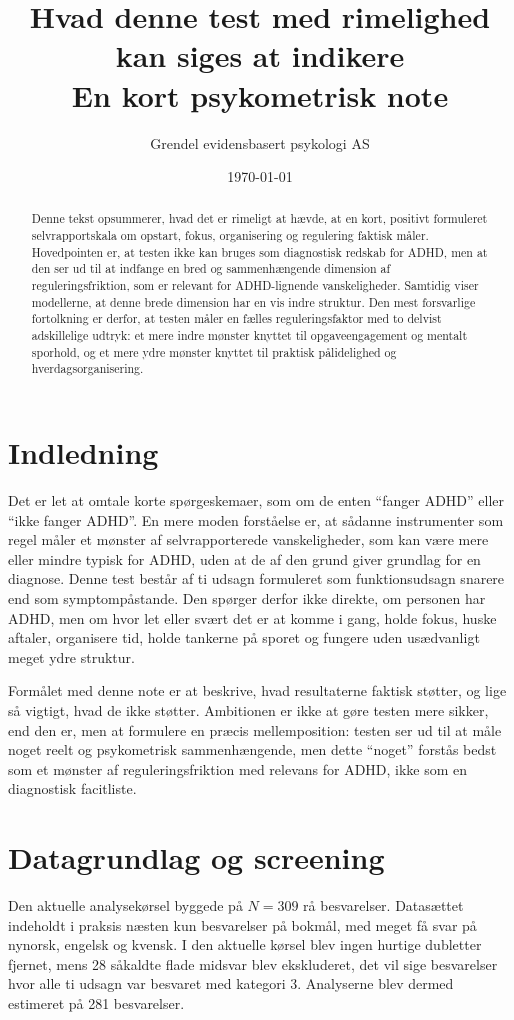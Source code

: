 \documentclass[11pt,a4paper]{article}
\title{Hvad denne test med rimelighed kan siges at indikere\\
\large En kort psykometrisk note}
\author{Grendel evidensbasert psykologi AS}
\date{\today}
\begin{document}
\maketitle

\begin{abstract}
Denne tekst opsummerer, hvad det er rimeligt at hævde, at en kort, positivt formuleret selvrapportskala om opstart, fokus, organisering og regulering faktisk måler. Hovedpointen er, at testen ikke kan bruges som diagnostisk redskab for ADHD, men at den ser ud til at indfange en bred og sammenhængende dimension af reguleringsfriktion, som er relevant for ADHD-lignende vanskeligheder. Samtidig viser modellerne, at denne brede dimension har en vis indre struktur. Den mest forsvarlige fortolkning er derfor, at testen måler en fælles reguleringsfaktor med to delvist adskillelige udtryk: et mere indre mønster knyttet til opgaveengagement og mentalt sporhold, og et mere ydre mønster knyttet til praktisk pålidelighed og hverdagsorganisering.
\end{abstract}

\section{Indledning}
Det er let at omtale korte spørgeskemaer, som om de enten ``fanger ADHD'' eller ``ikke fanger ADHD''. En mere moden forståelse er, at sådanne instrumenter som regel måler et mønster af selvrapporterede vanskeligheder, som kan være mere eller mindre typisk for ADHD, uden at de af den grund giver grundlag for en diagnose. Denne test består af ti udsagn formuleret som funktionsudsagn snarere end som symptompåstande. Den spørger derfor ikke direkte, om personen har ADHD, men om hvor let eller svært det er at komme i gang, holde fokus, huske aftaler, organisere tid, holde tankerne på sporet og fungere uden usædvanligt meget ydre struktur.

Formålet med denne note er at beskrive, hvad resultaterne faktisk støtter, og lige så vigtigt, hvad de ikke støtter. Ambitionen er ikke at gøre testen mere sikker, end den er, men at formulere en præcis mellemposition: testen ser ud til at måle noget reelt og psykometrisk sammenhængende, men dette ``noget'' forstås bedst som et mønster af reguleringsfriktion med relevans for ADHD, ikke som en diagnostisk facitliste.

\section{Datagrundlag og screening}
Den aktuelle analysekørsel byggede på $N = 309$ rå besvarelser. Datasættet indeholdt i praksis næsten kun besvarelser på bokmål, med meget få svar på nynorsk, engelsk og kvensk. I den aktuelle kørsel blev ingen hurtige dubletter fjernet, mens 28 såkaldte flade midsvar blev ekskluderet, det vil sige besvarelser hvor alle ti udsagn var besvaret med kategori 3. Analyserne blev dermed estimeret på 281 besvarelser.
\end{document}
